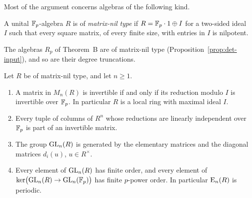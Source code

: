 Most of the argument concerns algebras of the following kind.

\begin{definition}\label{def:mn}
A unital $\mathbb F_p$-algebra $R$ is of \emph{matrix-nil type} if $R=\mathbb F_p\cdot1\oplus I$ for a two-sided ideal $I$ such that
every square matrix, of every finite size, with entries in $I$ is nilpotent.
\end{definition}

The algebras $R_p$ of Theorem~B are of matrix-nil type (Proposition~\ref{prop:det-input}), and so are their degree
truncations.

\begin{lemma}\label{lem:fp-local}
Let $R$ be of matrix-nil type, and let $n\geq1$.
\begin{enumerate}[label=\textup{(\roman*)}]
\item A matrix in $M_n(R)$ is invertible if and only if its reduction modulo $I$ is invertible over $\mathbb F_p$. In
particular $R$ is a local ring with maximal ideal $I$.
\item Every tuple of columns of $R^n$ whose reductions are linearly independent over $\mathbb F_p$ is part of an invertible
matrix.
\item The group $\operatorname{GL}_n(R)$ is generated by the elementary matrices and the diagonal matrices $d_i(u)$, $u\in R^\times$.
\item Every element of $\operatorname{GL}_n(R)$ has finite order, and every element of $\ker\bigl(\operatorname{GL}_n(R)\to\operatorname{GL}_n(\mathbb F_p)\bigr)$ has
finite $p$-power order. In particular $\operatorname{E}_n(R)$ is periodic.
\end{enumerate}
\end{lemma}

